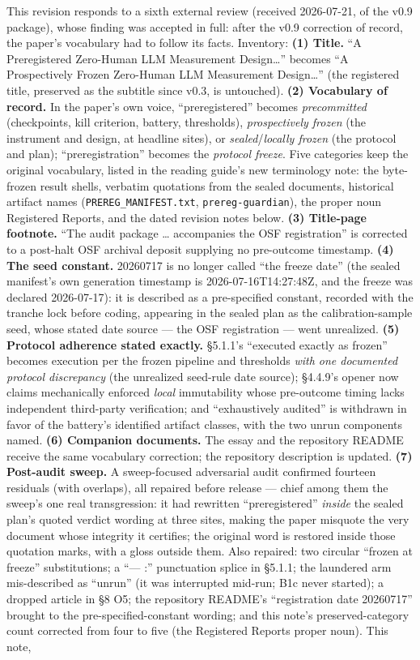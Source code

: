 This revision responds to a sixth external review (received 2026-07-21, of the v0.9 package), whose finding was accepted in full: after the v0.9 correction of record, the paper's vocabulary had to follow its facts. Inventory: \textbf{(1) Title.} ``A Preregistered Zero-Human LLM Measurement Design\ldots{}'' becomes ``A Prospectively Frozen Zero-Human LLM Measurement Design\ldots{}'' (the registered title, preserved as the subtitle since v0.3, is untouched). \textbf{(2) Vocabulary of record.} In the paper's own voice, ``preregistered'' becomes \emph{precommitted} (checkpoints, kill criterion, battery, thresholds), \emph{prospectively frozen} (the instrument and design, at headline sites), or \emph{sealed}/\emph{locally frozen} (the protocol and plan); ``preregistration'' becomes the \emph{protocol freeze}. Five categories keep the original vocabulary, listed in the reading guide's new terminology note: the byte-frozen result shells, verbatim quotations from the sealed documents, historical artifact names (\texttt{PREREG\_MANIFEST.txt}, \texttt{prereg-guardian}), the proper noun Registered Reports, and the dated revision notes below. \textbf{(3) Title-page footnote.} ``The audit package \ldots{} accompanies the OSF registration'' is corrected to a post-halt OSF archival deposit supplying no pre-outcome timestamp. \textbf{(4) The seed constant.} 20260717 is no longer called ``the freeze date'' (the sealed manifest's own generation timestamp is 2026-07-16T14:27:48Z, and the freeze was declared 2026-07-17): it is described as a pre-specified constant, recorded with the tranche lock before coding, appearing in the sealed plan as the calibration-sample seed, whose stated date source --- the OSF registration --- went unrealized. \textbf{(5) Protocol adherence stated exactly.} \S{}5.1.1's ``executed exactly as frozen'' becomes execution per the frozen pipeline and thresholds \emph{with one documented protocol discrepancy} (the unrealized seed-rule date source); \S{}4.4.9's opener now claims mechanically enforced \emph{local} immutability whose pre-outcome timing lacks independent third-party verification; and ``exhaustively audited'' is withdrawn in favor of the battery's identified artifact classes, with the two unrun components named. \textbf{(6) Companion documents.} The essay and the repository README receive the same vocabulary correction; the repository description is updated. \textbf{(7) Post-audit sweep.} A sweep-focused adversarial audit confirmed fourteen residuals (with overlaps), all repaired before release --- chief among them the sweep's one real transgression: it had rewritten ``preregistered'' \emph{inside} the sealed plan's quoted verdict wording at three sites, making the paper misquote the very document whose integrity it certifies; the original word is restored inside those quotation marks, with a gloss outside them. Also repaired: two circular ``frozen at freeze'' substitutions; a ``--- :'' punctuation splice in \S{}5.1.1; the laundered arm mis-described as ``unrun'' (it was interrupted mid-run; B1c never started); a dropped article in \S{}8 O5; the repository README's ``registration date 20260717'' brought to the pre-specified-constant wording; and this note's preserved-category count corrected from four to five (the Registered Reports proper noun). This note, 